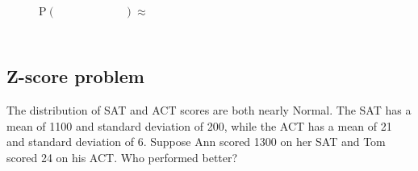 \documentclass[
  letterpaper,
  DIV=11,
  numbers=noendperiod]{scrartcl}
\begin{document}
\begin{figure}
\begin{minipage}[t]{0.33\linewidth}
{}

\end{minipage}%
%
\begin{minipage}[t]{0.33\linewidth}

{\centering 

\(\quad\)

}

\end{minipage}%
%
\begin{minipage}[t]{0.33\linewidth}

{\centering 

\(\quad\)

}

\end{minipage}%
\newline
\begin{minipage}[t]{0.33\linewidth}

{\centering 

\(\text{P}(\qquad\qquad\qquad) \approx\)

}

\end{minipage}%
%
\begin{minipage}[t]{0.33\linewidth}

{\centering 

\(\quad\)

}

\end{minipage}%
%
\begin{minipage}[t]{0.33\linewidth}

{\centering 

\(\quad\)

}

\end{minipage}%

\end{figure}

\vspace{4cm}

\hypertarget{z-score-problem}{%
\subsection{Z-score problem}\label{z-score-problem}}

The distribution of SAT and ACT scores are both nearly Normal. The SAT
has a mean of 1100 and standard deviation of 200, while the ACT has a
mean of 21 and standard deviation of 6. Suppose Ann scored 1300 on her
SAT and Tom scored 24 on his ACT. Who performed better?
\end{document}
